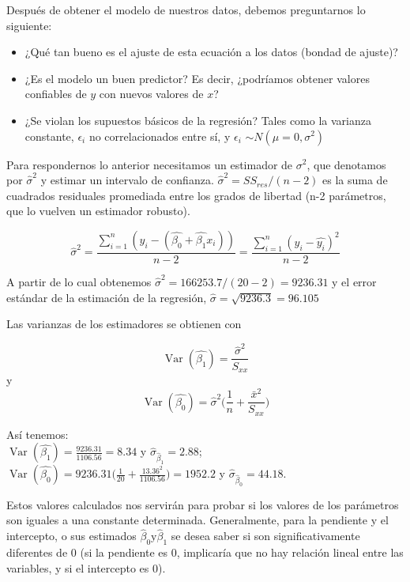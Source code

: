 \documentclass[letterpaper,12pt]{article}
\DeclareMathOperator{\Var}{\mathrm{Var}}
\begin{document}
Después de obtener el modelo de nuestros datos, debemos preguntarnos lo siguiente:

\begin{itemize}
	\item ¿Qué tan bueno es el ajuste de esta ecuación a los datos (bondad de ajuste)?
	\item ¿Es el modelo un buen predictor? Es decir, ¿podríamos obtener valores confiables de $y$ con nuevos valores de $x$?
	\item ¿Se violan los supuestos básicos de la regresión? Tales como la varianza constante, $\epsilon_i$ no correlacionados entre sí, y $\epsilon_i$ $\sim N(\mu = 0,\sigma^2)$
\end{itemize}

Para respondernos lo anterior necesitamos un estimador de $\sigma^2$, que denotamos por $\hat{\sigma}^2$ y estimar un intervalo de confianza. $\hat{\sigma}^2 = SS_{res}/(n-2)$ es la suma de cuadrados residuales promediada entre los grados de libertad (n-2 parámetros, que lo vuelven un estimador robusto).

\begin{equation}
 \hat{\sigma}^2 = \frac{\sum_{i=1}^{n}(y_i - (\hat{\beta_0}+\hat{\beta_1}x_i))}{n-2} = \frac{\sum_{i=1}^{n}(y_i - \hat{y_i})^2}{n-2}
\end{equation}

A partir de lo cual obtenemos $\hat{\sigma}^2 = 166253.7/(20-2) = 9236.31$ y el error estándar de la estimación de la regresión, $\hat{\sigma} = \sqrt{9236.3} = 96.105$

Las varianzas de los estimadores se obtienen con

\begin{equation}
	\Var(\hat{\beta_1})=\frac{\hat{\sigma}^2}{S_{xx}}
\end{equation}
y
\begin{equation}
	\Var(\hat{\beta_0}) = \hat{\sigma}^2\bigg(\frac{1}{n} + \frac{\bar{x}^2}{S_{xx}}\bigg)
\end{equation}

Así tenemos:\\ $\Var(\hat{\beta_1})= \frac{9236.31}{1106.56} = 8.34$ y $\hat{\sigma}_{\hat{\beta}_1}=2.88$;\\ $\Var(\hat{\beta_0})=9236.31\bigg(\frac{1}{20} + \frac{13.36^2}{1106.56}\bigg) = 1952.2$ y  $\hat{\sigma}_{\hat{\beta}_0}=44.18$.

Estos valores calculados nos servirán para probar si los valores de los parámetros son iguales a una constante determinada. Generalmente, para la pendiente y el intercepto, o sus estimados $\hat{\beta}_0 \text{y}\hat{\beta}_1$ se desea saber si son significativamente diferentes de 0 (si la pendiente es 0, implicaría que no hay relación lineal entre las variables, y si el intercepto es 0).
\end{document}
